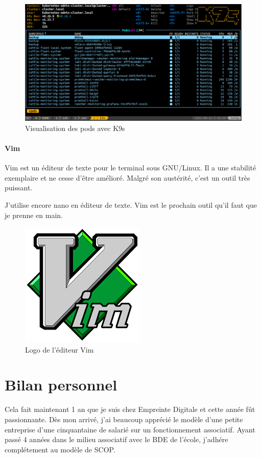 \documentclass[12pt, a4paper, twoside]{article}
\begin{document}
\begin{figure}[!ht]
    \centering
        \includegraphics[width=\textwidth]{src/interface_k9s.png}
    \caption{Visualisation des pods avec K9s}
    \label{fig:k9s}
\end{figure}

\subsection{Vim}
Vim est un éditeur de texte pour le terminal sous GNU/Linux. 
Il a une stabilité exemplaire et ne cesse d'être amélioré. 
Malgré son austérité, c'est un outil très puissant.

J'utilise encore nano en éditeur de texte.
Vim est le prochain outil qu'il faut que je prenne en main.

\begin{figure}[!ht]
    \centering
        \includegraphics[scale=0.4]{src/logo_vim.png}
    \caption{Logo de l'éditeur Vim}
    \label{fig:Vim}
\end{figure}

\newpage
\part{Bilan personnel}
Cela fait maintenant 1 an que je suis chez Empreinte Digitale et cette année fût passionnante.
Dès mon arrivé, j'ai beaucoup apprécié le modèle d'une petite entreprise d'une cinquantaine de salarié sur un fonctionnement associatif.
Ayant passé 4 années dans le milieu associatif avec le BDE de l'école, j'adhére complétement au modèle de \gls{SCOP}.\\
\end{document}
